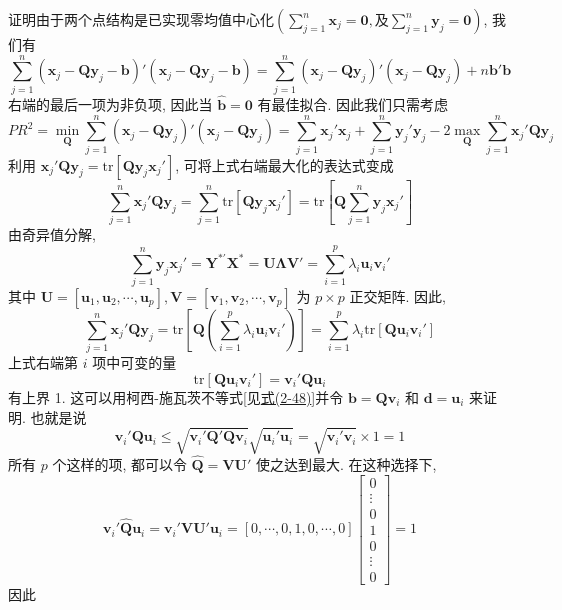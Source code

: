 证明\quad 由于两个点结构是已实现零均值中心化$\left(\sum_{j=1}^{n}\mathbf{x}_{j}=\mathbf{0}, \text{及} \sum_{j=1}^{n}\mathbf{y}_{j}=\mathbf{0}\right)$, 我们有
\[
\sum_{j=1}^{n}(\mathbf{x}_{j}-\mathbf{Q}\mathbf{y}_{j}-\mathbf{b})'(\mathbf{x}_{j}-\mathbf{Q}\mathbf{y}_{j}-\mathbf{b})=\sum_{j=1}^{n}(\mathbf{x}_{j}-\mathbf{Q}\mathbf{y}_{j})'(\mathbf{x}_{j}-\mathbf{Q}\mathbf{y}_{j})+n\mathbf{b}'\mathbf{b}
\]
右端的最后一项为非负项, 因此当 $\hat{\mathbf{b}}=\mathbf{0}$ 有最佳拟合. 因此我们只需考虑
\[
PR^{2}=\min_{\mathbf{Q}}\sum_{j=1}^{n}(\mathbf{x}_{j}-\mathbf{Q}\mathbf{y}_{j})'(\mathbf{x}_{j}-\mathbf{Q}\mathbf{y}_{j})=\sum_{j=1}^{n}\mathbf{x}_{j}'\mathbf{x}_{j}+\sum_{j=1}^{n}\mathbf{y}_{j}'\mathbf{y}_{j}-2\max_{\mathbf{Q}}\sum_{j=1}^{n}\mathbf{x}_{j}'\mathbf{Q}\mathbf{y}_{j}
\]
利用 $\mathbf{x}_{j}'\mathbf{Q}\mathbf{y}_{j}=\mathrm{tr}[\mathbf{Q}\mathbf{y}_{j}\mathbf{x}_{j}']$, 可将上式右端最大化的表达式变成
\[
\sum_{j=1}^{n}\mathbf{x}_{j}'\mathbf{Q}\mathbf{y}_{j}=\sum_{j=1}^{n}\mathrm{tr}[\mathbf{Q}\mathbf{y}_{j}\mathbf{x}_{j}']=\mathrm{tr}\left[\mathbf{Q}\sum_{j=1}^{n}\mathbf{y}_{j}\mathbf{x}_{j}'\right]
\]
由奇异值分解,
\[
\sum_{j=1}^{n}\mathbf{y}_{j}\mathbf{x}_{j}'=\mathbf{Y}^{*\prime}\mathbf{X}^{*}=\mathbf{U}\boldsymbol{\Lambda}\mathbf{V}'=\sum_{i=1}^{p}\lambda_{i}\mathbf{u}_{i}\mathbf{v}_{i}'
\]
其中 $\mathbf{U}=[\mathbf{u}_{1},\mathbf{u}_{2},\cdots,\mathbf{u}_{p}],\mathbf{V}=[\mathbf{v}_{1},\mathbf{v}_{2},\cdots,\mathbf{v}_{p}]$ 为 $p\times p$ 正交矩阵. 因此,
\[
\sum_{j=1}^{n}\mathbf{x}_{j}'\mathbf{Q}\mathbf{y}_{j}=\mathrm{tr}\left[\mathbf{Q}\left(\sum_{i=1}^{p}\lambda_{i}\mathbf{u}_{i}\mathbf{v}_{i}'\right)\right]=\sum_{i=1}^{p}\lambda_{i}\mathrm{tr}[\mathbf{Q}\mathbf{u}_{i}\mathbf{v}_{i}']
\]
上式右端第 $i$ 项中可变的量
\[
\mathrm{tr}[\mathbf{Q}\mathbf{u}_{i}\mathbf{v}_{i}']=\mathbf{v}_{i}'\mathbf{Q}\mathbf{u}_{i}
\]
有上界 1. 这可以用柯西-施瓦茨不等式[见\hyperref[eq:2-48]{式(2-48)}]并令 $\mathbf{b}=\mathbf{Q}\mathbf{v}_{i}$ 和 $\mathbf{d}=\mathbf{u}_{i}$ 来证明. 也就是说
\[
\mathbf{v}_{i}'\mathbf{Q}\mathbf{u}_{i}\leqslant\sqrt{\mathbf{v}_{i}'\mathbf{Q}'\mathbf{Q}\mathbf{v}_{i}}\sqrt{\mathbf{u}_{i}'\mathbf{u}_{i}}=\sqrt{\mathbf{v}_{i}'\mathbf{v}_{i}}\times 1=1
\]
所有 $p$ 个这样的项, 都可以令 $\hat{\mathbf{Q}}=\mathbf{V}\mathbf{U}'$ 使之达到最大. 在这种选择下,
\[
\mathbf{v}_{i}'\hat{\mathbf{Q}}\mathbf{u}_{i}=\mathbf{v}_{i}'\mathbf{V}\mathbf{U}'\mathbf{u}_{i}
=[0,\cdots,0,1,0,\cdots,0]
\begin{bmatrix}
0\\ \vdots\\ 0\\ 1\\ 0\\ \vdots\\ 0
\end{bmatrix}=1
\]
因此
